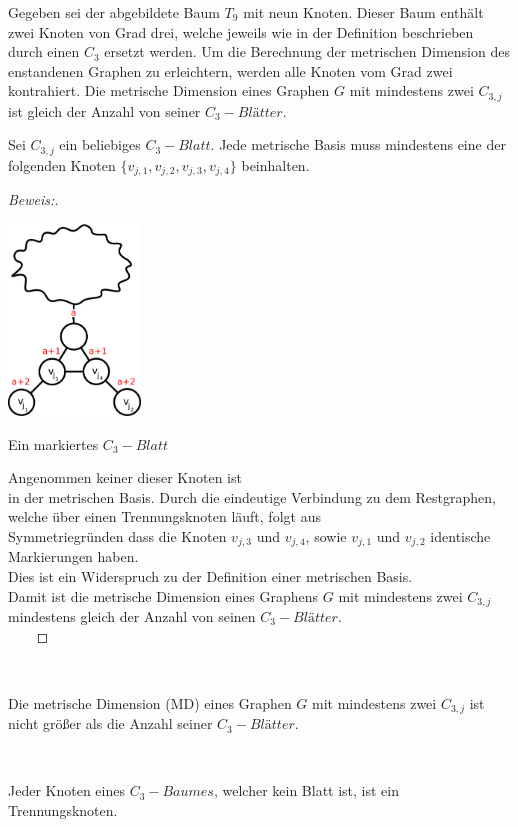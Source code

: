 Gegeben sei der abgebildete Baum $T_9$ mit neun Knoten. Dieser Baum enthält zwei Knoten von Grad drei, welche jeweils wie in der Definition beschrieben durch einen $C_3$ ersetzt werden. Um die Berechnung der metrischen Dimension des enstandenen Graphen zu erleichtern, werden alle Knoten vom Grad zwei kontrahiert.
Die metrische Dimension eines Graphen $G$ mit mindestens zwei $C_{3,j}$ ist gleich der Anzahl von seiner $C_{3}-Blätter$.
\begin{lem}
Sei $C_{3,j}$ ein beliebiges $C_{3}-Blatt$. Jede metrische Basis muss mindestens eine der folgenden Knoten $\{v_{j,1},v_{j,2},v_{j,3},v_{j,4}\}$ beinhalten.
\end{lem}
\begin{proof}[Beweis:]
\textcolor{white}{lala}
\begin{floatingfigure}[l]{200pt}
\centering
\includegraphics*[width = 100pt]{bilder/beweis.pdf}
\caption{Ein markiertes $C_{3}-Blatt$}
\end{floatingfigure}
Angenommen keiner dieser Knoten ist\\in der metrischen Basis. Durch die eindeutige Verbindung zu dem Restgraphen, welche über einen Trennungsknoten läuft, folgt aus\\Symmetriegründen dass die Knoten $v_{j,3}$ und $v_{j,4}$, sowie $v_{j,1}$ und $v_{j,2}$ identische Markierungen haben.\\Dies ist ein Widerspruch zu der Definition einer metrischen Basis.\\
Damit ist die metrische Dimension eines Graphens $G$ mit mindestens zwei $C_{3,j}$\\mindestens gleich der Anzahl von seinen $C_{3}-Blätter$.\textcolor{white}{lala}\\\textcolor{white}{lala}
\end{proof}
\textcolor{white}{lala} \vspace{-6mm}
\begin{lem}
Die metrische Dimension (MD) eines Graphen $G$ mit mindestens zwei $C_{3,j}$ ist nicht größer als die Anzahl seiner $C_{3}-Blätter$. 
\end{lem}
\textcolor{white}{lala} \vspace{-6mm}
\begin{lem}
\label{bkb}
Jeder Knoten eines $C_{3}-Baumes$, welcher kein Blatt ist, ist ein Trennungsknoten.
\end{lem}


